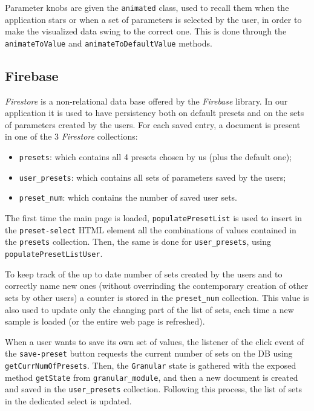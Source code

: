 \documentclass[12pt, a4paper]{article}
\begin{document}
Parameter knobs are given the \texttt{animated} class, used to recall them when the application stars or when a set of parameters is selected by the user, in order to make the visualized data swing to the correct one. This is done through the \texttt{animateToValue} and \texttt{animateToDefaultValue} methods.

\subsection{Firebase}
\emph{Firestore} is a non-relational data base offered by the \emph{Firebase} library. In our application it is used to have persistency both on default presets and on the sets of parameters created by the users. For each saved entry, a document is present in one of the 3 \emph{Firestore} collections:
\begin{itemize}
    \item \texttt{presets}: which contains all 4 presets chosen by us (plus the default one);
    \item \texttt{user\_presets}: which contains all sets of parameters saved by the users;
    \item \texttt{preset\_num}: which contains the number of saved user sets.
\end{itemize}

The first time the main page is loaded, \texttt{populatePresetList} is used to insert in the \texttt{preset-select} HTML element all the combinations of values contained in the \texttt{presets} collection. Then, the same is done for \texttt{user\_presets}, using \texttt{populatePresetListUser}. 

To keep track of the up to date number of sets created by the users and to correctly name new ones (without overrinding the contemporary creation of other sets by other users) a counter is stored in the \texttt{preset\_num} collection. \newline This value is also used to update only the changing part of the list of sets, each time a new sample is loaded (or the entire web page is refreshed).

When a user wants to save its own set of values, the listener of the click event of the \texttt{save-preset} button requests the current number of sets on the DB using \texttt{getCurrNumOfPresets}. Then, the \texttt{Granular} state is gathered with the exposed method  \texttt{getState} from \texttt{granular\_module}, and then a new document is created and saved in the \texttt{user\_presets} collection. Following this process, the list of sets in the dedicated select is updated. 
\end{document}
